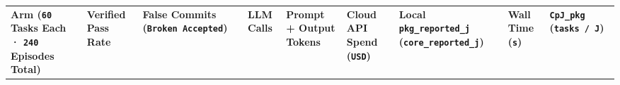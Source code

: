 \documentclass[10pt,letterpaper]{article}
\begin{document}
{\scriptsize\setlength{\tabcolsep}{2.4pt}\renewcommand{\arraystretch}{1.12}
\begin{longtable}[]{@{}
  >{\raggedright\arraybackslash}p{}
  >{\raggedleft\arraybackslash}p{}
  >{\raggedleft\arraybackslash}p{}
  >{\raggedleft\arraybackslash}p{}
  >{\raggedleft\arraybackslash}p{}
  >{\raggedleft\arraybackslash}p{}
  >{\raggedleft\arraybackslash}p{}
  >{\raggedleft\arraybackslash}p{}
  >{\raggedleft\arraybackslash}p{}@{}}
\toprule\noalign{}
\begin{minipage}[b]{\linewidth}\raggedright
\textbf{Arm (\texttt{60} Tasks Each · \texttt{240} Episodes Total)}
\end{minipage} & \begin{minipage}[b]{\linewidth}\raggedleft
\textbf{Verified Pass Rate}
\end{minipage} & \begin{minipage}[b]{\linewidth}\raggedleft
\textbf{False Commits (\texttt{Broken\ Accepted})}
\end{minipage} & \begin{minipage}[b]{\linewidth}\raggedleft
\textbf{LLM Calls}
\end{minipage} & \begin{minipage}[b]{\linewidth}\raggedleft
\textbf{Prompt + Output Tokens}
\end{minipage} & \begin{minipage}[b]{\linewidth}\raggedleft
\textbf{Cloud API Spend (\texttt{USD})}
\end{minipage} & \begin{minipage}[b]{\linewidth}\raggedleft
\textbf{Local \texttt{pkg\_\allowbreak{}reported\_\allowbreak{}j} (\texttt{core\_\allowbreak{}reported\_\allowbreak{}j})}
\end{minipage} & \begin{minipage}[b]{\linewidth}\raggedleft
\textbf{Wall Time (\texttt{s})}
\end{minipage} & \begin{minipage}[b]{\linewidth}\raggedleft
\textbf{\texttt{CpJ\_pkg} (\texttt{tasks\ /\allowbreak{}\ J})}
\end{minipage} \\

\end{longtable}}
\end{document}
